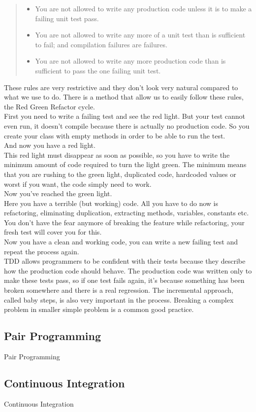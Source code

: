 \begin{quote}
\begin{itemize}
\item You are not allowed to write any production code unless it is to make
a failing unit test pass.
\item You are not allowed to write any more of a unit test than is sufficient
to fail;
and compilation failures are failures.
\item You are not allowed to write any more production code than is sufficient
to pass the one failing unit test.
\end{itemize}
\end{quote}

These rules are very restrictive and they don't look very natural compared to
what we use to do.
There is a method that allow us to easily follow these rules, the Red Green
Refactor cycle. \\
\newline
First you need to write a failing test and see the red light.
But your test cannot even run, it doesn't compile because there is actually
no production code.
So you create your class with empty methods in order to be able to run the
test. \\
And now you have a red light. \\
\newline
This red light must disappear as soon as possible, so you have to write
the minimum amount of code required to turn the light green.
The minimum means that you are rushing to the green light, duplicated code,
hardcoded values or worst if you want, the code simply need to work. \\
Now you've reached the green light. \\
\newline
Here you have a terrible (but working) code.
All you have to do now is refactoring, eliminating duplication,
extracting methods, variables, constants etc.
You don't have the fear anymore of breaking the feature while refactoring,
your fresh test will cover you for this. \\
Now you have a clean and working code, you can write a new failing test and
repeat the process again. \\
\newline
TDD allows programmers to be confident with their tests because they
describe how the production code should behave.
The production code was written only to make these tests pass, so if one test
fails again, it's because something has been broken somewhere and there is a
real regression.
The incremental approach, called baby steps, is also very important in
the process.
Breaking a complex problem in smaller simple problem is a common good
practice.

\subsection{Pair Programming}\label{subsec:pair-programming}
Pair Programming

\subsection{Continuous Integration}\label{subsec:continuous-integration}
Continuous Integration
